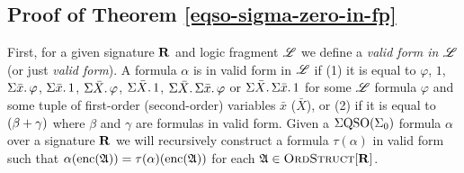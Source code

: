 \subsection{Proof of Theorem \ref{eqso-sigma-zero-in-fp}}

First, for a given signature $\mathbf{R}$ and logic fragment $\mathscr{L}$ we define a {\em valid form in $\mathscr{L}$} (or just {\em valid form}). A formula $\alpha$ is in valid form in $\mathscr{L}$ if (1) it is equal to $\varphi$, $1$, $\Sigma{\bar{x}}.\,\varphi$, $\Sigma{\bar{x}}.\,1$, $\Sigma{\bar{X}}.\,\varphi$, $\Sigma{\bar{X}}.\,1$, $\Sigma{\bar{X}}.\,\Sigma{\bar{x}}.\,\varphi$ or $\Sigma{\bar{X}}.\,\Sigma{\bar{x}}.\,1$ for some $\mathscr{L}$ formula $\varphi$ and some tuple of first-order (second-order) variables $\bar{x}$ ($\bar{X}$), or (2) if it is equal to $(\beta+\gamma)$ where $\beta$ and $\gamma$ are formulas in valid form. Given a $\Sigma{\rm QSO}(\Sigma_{0})$ formula $\alpha$ over a signature $\mathbf{R}$ we will recursively construct a formula $\tau(\alpha)$ in valid form such that $\alpha({\rm enc}(\mathfrak{A})) = \tau(\alpha)({\rm enc}(\mathfrak{A}))$ for each $\mathfrak{A}\in\text{\sc OrdStruct}[\mathbf{R}]$. 

